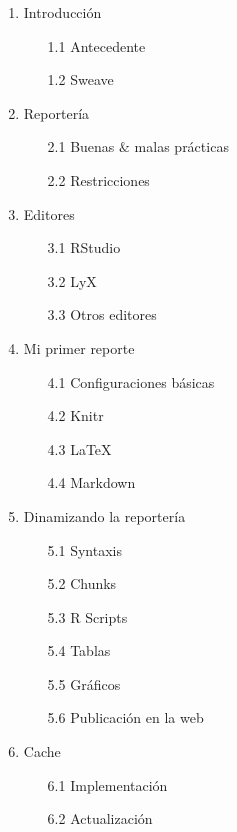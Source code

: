 \documentclass[12pt,a4paper,oneside]{article}\usepackage[]{graphicx}\usepackage[]{color}
\begin{document}
\begin{enumerate}
  \item {\Large Introducción}
  \begin{enumerate}
    \item[1.1] Antecedente
    \item[1.2] Sweave
  \end{enumerate}
  \item {\Large Reportería}
  \begin{enumerate}
    \item[2.1] Buenas $\&$ malas prácticas
    \item[2.2] Restricciones
  \end{enumerate}
  \item {\Large Editores}
  \begin{enumerate}
    \item[3.1] RStudio
    \item[3.2] LyX
    \item[3.3] Otros editores
  \end{enumerate}
  \item {\Large Mi primer reporte}
    \begin{enumerate}
    \item[4.1] Configuraciones básicas
    \item[4.2] Knitr
    \item[4.3] LaTeX
    \item[4.4] Markdown
  \end{enumerate}
  \item {\Large Dinamizando la reportería}
  \begin{enumerate}
    \item[5.1] Syntaxis
    \item[5.2] Chunks
    \item[5.3] R Scripts
    \item[5.4] Tablas
    \item[5.5] Gráficos
    \item[5.6] Publicación en la web
  \end{enumerate}
  \item {\Large Cache}
    \begin{enumerate}
    \item[6.1] Implementación
    \item[6.2] Actualización
  \end{enumerate}
\end{enumerate}
\end{document}

